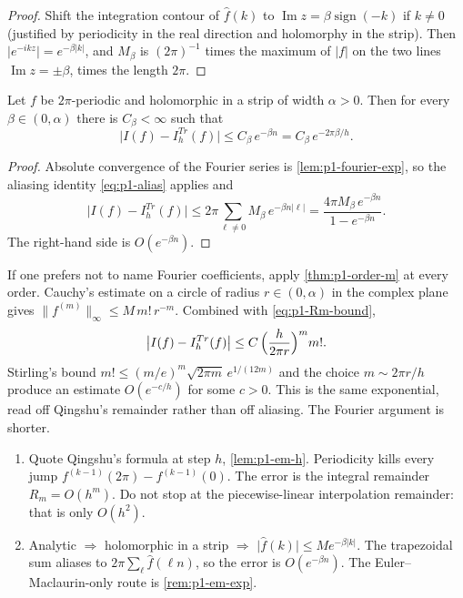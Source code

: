 \begin{proof}
Shift the integration contour of \(\hat f(k)\) to \(\operatorname{Im}z=\beta\operatorname{sign}(-k)\) if \(k\neq 0\) (justified by periodicity in the real direction and holomorphy in the strip). Then \(\lvert e^{-ikz}\rvert=e^{-\beta\lvert k\rvert}\), and \(M_{\beta}\) is \((2\pi)^{-1}\) times the maximum of \(\lvert f\rvert\) on the two lines \(\operatorname{Im}z=\pm\beta\), times the length \(2\pi\).
\end{proof}

\begin{theorem}
\label{thm:p1-exp}
Let \(f\) be \(2\pi\)-periodic and holomorphic in a strip of width \(\alpha>0\). Then for every \(\beta\in(0,\alpha)\) there is \(C_{\beta}<\infty\) such that
\[
\bigl\lvert I(f)-I_{h}^{Tr}(f)\bigr\rvert
\le
C_{\beta}\,e^{-\beta n}
=
C_{\beta}\,e^{-2\pi\beta/h}.
\]
\end{theorem}

\begin{proof}
Absolute convergence of the Fourier series is \cref{lem:p1-fourier-exp}, so the aliasing identity \eqref{eq:p1-alias} applies and
\[
\bigl\lvert I(f)-I_{h}^{Tr}(f)\bigr\rvert
\le
2\pi\sum_{\ell\neq 0}
M_{\beta}\,e^{-\beta n\lvert\ell\rvert}
=
\frac{4\pi M_{\beta}\,e^{-\beta n}}{1-e^{-\beta n}}.
\]
The right-hand side is \(O(e^{-\beta n})\).
\end{proof}

\begin{remark}
\label{rem:p1-em-exp}
If one prefers not to name Fourier coefficients, apply \cref{thm:p1-order-m} at every order. Cauchy's estimate on a circle of radius \(r\in(0,\alpha)\) in the complex plane gives \(\lVert f^{(m)}\rVert_{\infty}\le M\,m!\,r^{-m}\). Combined with \eqref{eq:p1-Rm-bound},
\[
\bigl\lvert I(f)-I_{h}^{Tr}(f)\bigr\rvert
\le
C\,\Bigl(\frac{h}{2\pi r}\Bigr)^{m}m!.
\]
Stirling's bound \(m!\le (m/e)^{m}\sqrt{2\pi m}\,e^{1/(12m)}\) and the choice \(m\sim 2\pi r/h\) produce an estimate \(O(e^{-c/h})\) for some \(c>0\). This is the same exponential, read off Qingshu's remainder rather than off aliasing. The Fourier argument is shorter.
\end{remark}

\begin{examnote}
\label{examnote:p1}
\begin{enumerate}[label=\textup{(\roman*)}]
    \item Quote Qingshu's formula at step \(h\), \cref{lem:p1-em-h}. Periodicity kills every jump \(f^{(k-1)}(2\pi)-f^{(k-1)}(0)\). The error is the integral remainder \(R_{m}=O(h^{m})\). Do not stop at the piecewise-linear interpolation remainder: that is only \(O(h^{2})\).
    \item Analytic \(\Rightarrow\) holomorphic in a strip \(\Rightarrow\) \(\lvert\hat f(k)\rvert\le M e^{-\beta\lvert k\rvert}\). The trapezoidal sum aliases to \(2\pi\sum_{\ell}\hat f(\ell n)\), so the error is \(O(e^{-\beta n})\). The Euler--Maclaurin-only route is \cref{rem:p1-em-exp}.
\end{enumerate}
\end{examnote}

